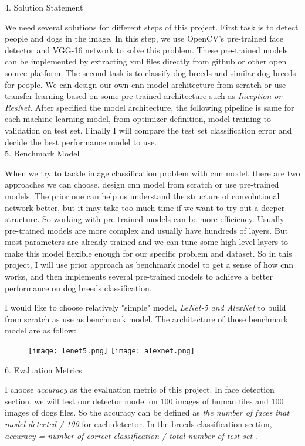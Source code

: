 \documentclass{article}
\begin{document}
4. Solution Statement

We need several solutions for different steps of this project. First task is to detect people and dogs in the image. In this step, we use OpenCV's pre-trained face detector and VGG-16 network to solve this problem. These pre-trained models can be implemented by extracting xml files directly from github or other open source platform. The second task is to classify dog breeds and similar dog breeds for people. We can design our own cnn model architecture from scratch or use transfer learning based on some pre-trained architecture such as \textit{Inception or ResNet}. After specified the model architecture, the following pipeline is same for each machine learning model, from optimizer definition, model training to validation on test set. Finally I will compare the test set classification error and decide the best performance model to use.
\\


5. Benchmark Model

When we try to tackle image classification problem with cnn model, there are two approaches we can choose, design cnn model from scratch or use pre-trained models. The prior one can help us understand the structure of convolutional network better, but it may take too much time if we want to try out a deeper structure. So working with pre-trained models can be more efficiency. Usually pre-trained models are more complex and usually have hundreds of layers. But most parameters are already trained and we can tune some high-level layers to make this model flexible enough for our specific problem and dataset. So in this project, I will use prior approach as benchmark model to get a sense of how cnn works, and then implements several pre-trained models to achieve a better performance on dog breeds classification. 

I would like to choose relatively "simple" model, \textit{LeNet-5 and AlexNet} to build from scratch as use as benchmark model. The architecture of those benchmark model are as follow\cite{cnn_architec}:
\begin{figure}[hbt!]
\texttt{[image: lenet5.png]}
\texttt{[image: alexnet.png]}
\end{figure}


6. Evaluation Metrics

I choose \textit{accuracy} as the evaluation metric of this project. In face detection section, we will test our detector model on 100 images of human files and 100 images of dogs files. So the accuracy can be defined as \textit{the number of faces that model detected / 100 } for each detector. In the breeds classification section, \textit{accuracy = number of correct classification / total number of test set} .
\end{document}
